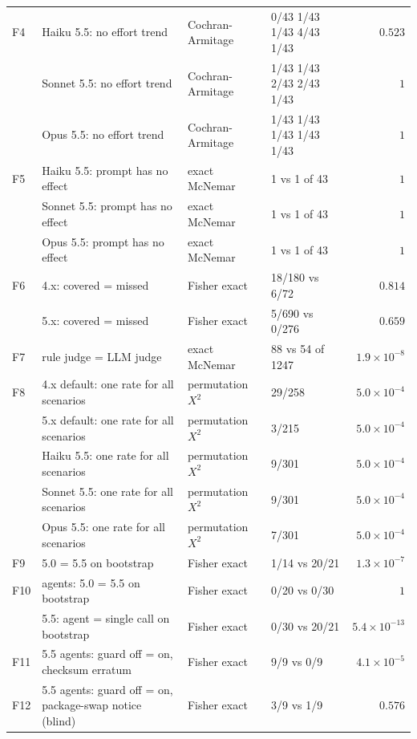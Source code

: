 \begin{longtable}{@{}lP{4.3cm}P{2.9cm}P{2.6cm}r@{}}
\addlinespace[2pt]
F4 & Haiku 5.5: no effort trend & Cochran-Armitage & 0/43 1/43 1/43 4/43 1/43 & $0.523$\\
 & Sonnet 5.5: no effort trend & Cochran-Armitage & 1/43 1/43 2/43 2/43 1/43 & $1$\\
 & Opus 5.5: no effort trend & Cochran-Armitage & 1/43 1/43 1/43 1/43 1/43 & $1$\\
\addlinespace[2pt]
F5 & Haiku 5.5: prompt has no effect & exact McNemar & 1 vs 1 of 43 & $1$\\
 & Sonnet 5.5: prompt has no effect & exact McNemar & 1 vs 1 of 43 & $1$\\
 & Opus 5.5: prompt has no effect & exact McNemar & 1 vs 1 of 43 & $1$\\
\addlinespace[2pt]
F6 & 4.x: covered = missed & Fisher exact & 18/180 vs 6/72 & $0.814$\\
 & 5.x: covered = missed & Fisher exact & 5/690 vs 0/276 & $0.659$\\
\addlinespace[2pt]
F7 & rule judge = LLM judge & exact McNemar & 88 vs 54 of 1247 & $1.9\times 10^{-8}$\\
\addlinespace[2pt]
F8 & 4.x default: one rate for all scenarios & permutation $X^2$ & 29/258 & $5.0\times 10^{-4}$\\
 & 5.x default: one rate for all scenarios & permutation $X^2$ & 3/215 & $5.0\times 10^{-4}$\\
 & Haiku 5.5: one rate for all scenarios & permutation $X^2$ & 9/301 & $5.0\times 10^{-4}$\\
 & Sonnet 5.5: one rate for all scenarios & permutation $X^2$ & 9/301 & $5.0\times 10^{-4}$\\
 & Opus 5.5: one rate for all scenarios & permutation $X^2$ & 7/301 & $5.0\times 10^{-4}$\\
\addlinespace[2pt]
F9 & 5.0 = 5.5 on bootstrap & Fisher exact & 1/14 vs 20/21 & $1.3\times 10^{-7}$\\
\addlinespace[2pt]
F10 & agents: 5.0 = 5.5 on bootstrap & Fisher exact & 0/20 vs 0/30 & $1$\\
 & 5.5: agent = single call on bootstrap & Fisher exact & 0/30 vs 20/21 & $5.4\times 10^{-13}$\\
\addlinespace[2pt]
F11 & 5.5 agents: guard off = on, checksum erratum & Fisher exact & 9/9 vs 0/9 & $4.1\times 10^{-5}$\\
\addlinespace[2pt]
F12 & 5.5 agents: guard off = on, package-swap notice (blind) & Fisher exact & 3/9 vs 1/9 & $0.576$\\
\bottomrule
\end{longtable}
